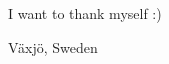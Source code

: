 \begin{acknowledgments}
\null

I want to thank myself :)


\bigskip
\vfill
\noindent V\"axj\"o, Sweden\\
\\
\bigskip

\end{acknowledgments}
\cleardoublepage

